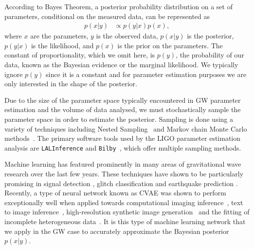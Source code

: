 \documentclass[%
showpacs,
 amsmath,amssymb,
 aps,
 twocolumn,
 prl,
 reprint,
floatfix,
]{revtex4-1}
\begin{document}
%
%
According to Bayes Theorem, a posterior probability distribution on a set of
parameters, conditional on the measured data, can be represented as
%
\begin{align}\label{eq:bayes_theorem} 
p(x|y) &\propto p(y|x) p(x), 
\end{align}
%
where $x$ are the parameters, $y$ is the observed data, $p(x|y)$ is the
posterior, $p(y|x)$ is the likelihood, and $p(x)$ is the prior on the
parameters. The constant of proportionality, which we omit here, is
$p(y)$, the probability of our data, known as the Bayesian evidence or the
marginal likelihood. We typically ignore $p(y)$ since it is a constant and for
parameter estimation purposes we are only interested in the shape of the
posterior.

%
%
Due to the size of the parameter space typically encountered in \ac{GW}
parameter estimation and the volume of data analysed, we must stochastically
sample the parameter space in order to estimate the posterior.  Sampling is
done using a variety of techniques including Nested
Sampling~\cite{skilling2006,cpnest,dynesty} and Markov chain Monte Carlo
methods~\cite{emcee,ptemcee}. The primary software tools used by the \ac{LIGO}
parameter estimation analysis are \texttt{LALInference} and
\texttt{Bilby}~\cite{1409.7215,1811.02042}, which offer multiple sampling
methods.  
  
%
%
Machine learning has featured prominently in many areas of gravitational wave
research over the last few years. These techniques have shown to be
particularly promising in signal detection
\cite{GEORGE201864,PhysRevLett.120.141103,1904.08693}, glitch classification
\cite{1706.07446,0264-9381-34-6-064003} and earthquake prediction
\cite{Coughlin_2017}. Recently, a type of neural network known as \ac{CVAE} was
shown to perform exceptionally well when applied towards computational imaging
inference~\cite{1904.06264,NIPS2015_5775}, text to image
inference~\cite{1512.00570}, high-resolution synthetic image
generation~\cite{1612.00005} and the fitting of incomplete heterogeneous
data~\cite{1807.03653}. It is this type of machine learning network that we
apply in the \ac{GW} case to accurately approximate the Bayesian posterior
$p(x|y)$.
\end{document}
